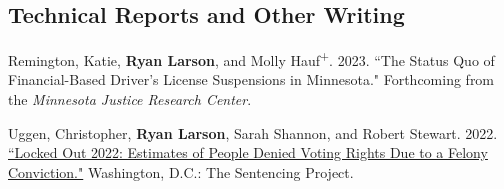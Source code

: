 \documentclass[letterpaper]{article}
\renewenvironment{itemize}{
  \begin{list}{}{
    \setlength{\leftmargin}{1.5em}
  }
}{
  \end{list}
}
\begin{document}
\subsection*{Technical Reports and Other Writing}

\begin{itemize}

\item Remington, Katie, \textbf{Ryan Larson}, and Molly Hauf\textsuperscript{+}. 2023. ``The Status Quo of Financial-Based Driver's License Suspensions in Minnesota." Forthcoming from the \textit{Minnesota Justice Research Center}.

\item Uggen, Christopher, \textbf{Ryan Larson}, Sarah Shannon, and Robert Stewart.  2022. \href{https://www.sentencingproject.org/app/uploads/2024/02/Locked-Out-2022-Estimates-of-People-Denied-Voting.pdf}{``Locked Out 2022: Estimates of People Denied Voting Rights Due to a Felony Conviction."} Washington, D.C.: The Sentencing Project.
\begin{itemize}

\end{itemize}
\end{itemize}
\end{document}
